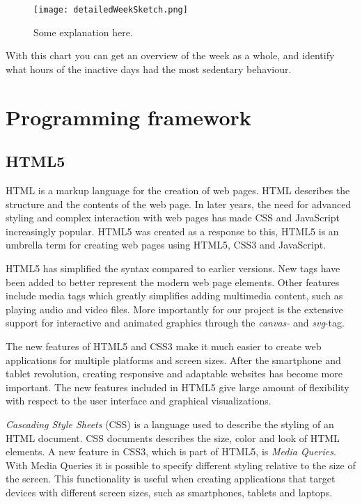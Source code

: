 \begin{figure}[h!]
	\centering
		\texttt{[image: detailedWeekSketch.png]}
		\caption{\footnotesize Some explanation here.}
		\label{fig:detailedWeek}
\end{figure}

With this chart you can get an overview of the week as a whole, and identify what hours of the inactive days had the most sedentary behaviour. 

\section{Programming framework}
\subsection{HTML5}
HTML is a markup language for the creation of web pages. HTML describes the structure and the contents of the web page. In later years, the need for advanced styling and complex interaction with web pages has made CSS and JavaScript increasingly popular. HTML5 was created as a response to this, HTML5 is an umbrella term for creating web pages using HTML5, CSS3 and JavaScript.

HTML5 has simplified the syntax compared to earlier versions. New tags have been added to better represent the modern web page elements. Other features include media tags which greatly simplifies adding multimedia content, such as playing audio and video files. More importantly for our project is the extensive support for interactive and animated graphics through the \emph{canvas-} and \emph{svg}-tag.

The new features of HTML5 and CSS3 make it much easier to create web applications for multiple platforms and screen sizes. After the smartphone and tablet revolution, creating responsive and adaptable websites has become more important. The new features included in HTML5 give large amount of flexibility with respect to the user interface and graphical visualizations.

\emph{Cascading Style Sheets} (CSS) is a language used to describe the styling of an HTML document. CSS documents describes the size, color and look of HTML elements. A new feature in CSS3, which is part of HTML5, is \emph{Media Queries}. With Media Queries it is possible to specify different styling relative to the size of the screen. This functionality is useful when creating applications that target devices with different screen sizes, such as smartphones, tablets and laptops. 

